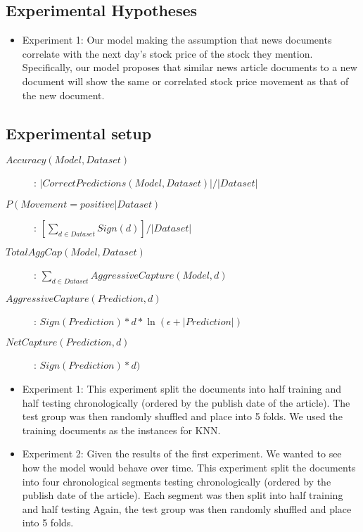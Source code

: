 \documentclass[11pt,letterpaper]{article}
\newcommand{\blue}[1]{\textcolor{RoyalBlue}{#1}}
\newcommand{\instructions}[1]{\blue{\textit{#1}}}
\begin{document}
\subsection{Experimental Hypotheses}
\label{sec:exper-hypoth}
\begin{itemize}
  \item Experiment 1: Our model making the assumption that news documents
  correlate with the next day's stock price of the stock they mention.
  Specifically, our model proposes that similar news article documents to a new
  document will show the same or correlated stock price movement as that of the new document.
\end{itemize}

\subsection{Experimental setup}
\label{sec:experimental-setup}
\begin{description}
  \item[\(Accuracy(Model, Dataset)\)] : $|CorrectPredictions(Model, Dataset)| / |Dataset|$
  \item[\(P(Movement = positive | Dataset)\)] : $[\sum_{d \in Dataset} Sign(d)] / |Dataset|$
  \item[\(TotalAggCap(Model, Dataset)\)] : $\sum_{d \in Dataset} AggressiveCapture(Model, d) $
  \item[\(AggressiveCapture(Prediction, d)\)] : $Sign(Prediction) * d * \ln(\epsilon + |Prediction|)$
  \item[\(NetCapture(Prediction, d)\)] : $Sign(Prediction) * d)$
\end{description}

\begin{itemize}
  \item Experiment 1: This experiment split the documents into half training and half testing
  chronologically (ordered by the publish date of the article). The test group
  was then randomly shuffled and place into 5 folds. We used the training documents as the
  instances for KNN.
  \item Experiment 2: Given the results of the first experiment. We wanted to see
  how the model would behave over time. This experiment split the documents into
  four chronological segments testing chronologically (ordered by the publish
  date of the article). Each segment was then split into half training and half testing
  Again, the test group was then randomly shuffled and place into 5
  folds.
\end{itemize}
\end{document}
